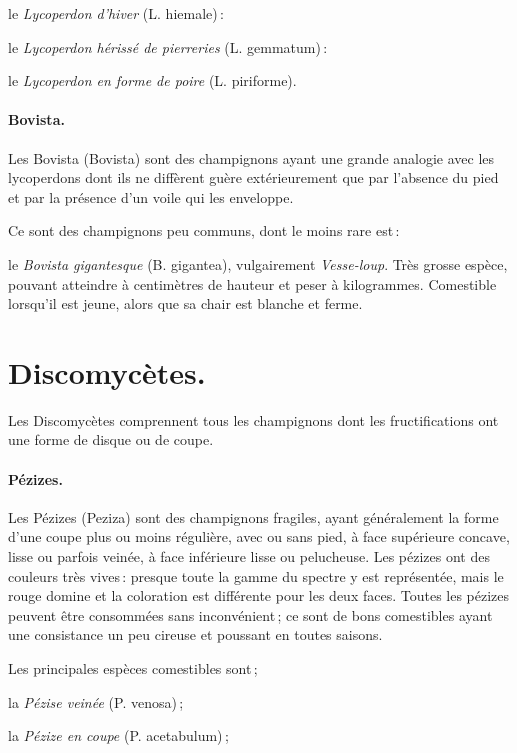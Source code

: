 le \textit{Lycoperdon d'hiver} (L. hiemale) :

le \textit{Lycoperdon hérissé de pierreries} (L. gemmatum) :

le \textit{Lycoperdon en forme de poire} (L. piriforme).

\paragraph{Bovista.}

Les Bovista (Bovista) sont des champignons ayant une grande analogie avec
les lycoperdons dont ils ne diffèrent guère extérieurement que par l'absence du
pied et par la présence d'un voile qui les enveloppe.

Ce sont des champignons peu communs, dont le moins rare est :

le \textit{Bovista gigantesque} (B. gigantea), vulgairement
\textit{Vesse-loup}. Très grosse espèce, pouvant atteindre {\mmm}
à {\mmm} centimètres de hauteur et peser {\mmm} à {\mmm}
kilogrammes. Comestible lorsqu'il est jeune, alors que sa chair est blanche et
ferme.

\section*{\centering Discomycètes.}

Les Discomycètes comprennent tous les champignons dont les fructifications ont
une forme de disque ou de coupe.

\paragraph{Pézizes.}

Les Pézizes (Peziza) sont des champignons fragiles, ayant généralement la forme
d'une coupe plus ou moins régulière, avec ou sans pied, à face supérieure
concave, lisse ou parfois veinée, à face inférieure lisse ou pelucheuse. Les
pézizes ont des couleurs très vives : presque toute la gamme du spectre y est
représentée, mais le rouge domine et la coloration est différente pour les deux
faces. Toutes les pézizes peuvent être consommées sans inconvénient ; ce sont
de bons comestibles ayant une consistance un peu cireuse et poussant en toutes
saisons.

Les principales espèces comestibles sont ;

la \textit{Pézise veinée} (P. venosa) ;

la \textit{Pézize en coupe} (P. acetabulum) ;

